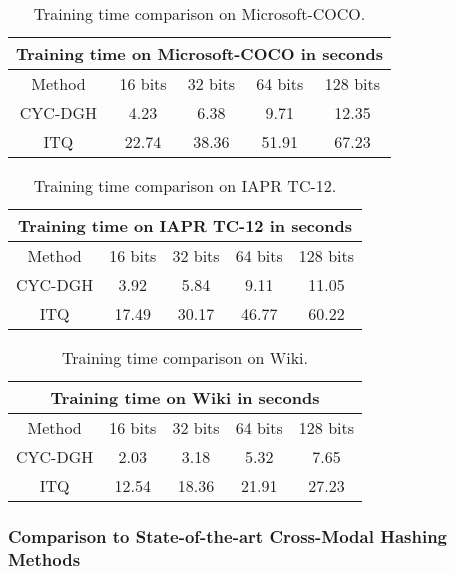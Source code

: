 \documentclass[10pt,journal,twocolumn]{IEEEtran}
\begin{document}
\begin{table}[t]
  \centering
  \begin{tabular}{ |c|c|c|c|c|}
  \hline
  \multicolumn{5}{|c|}{Training time on Microsoft-COCO in seconds} \\
  \hline
  Method & 16 bits & 32 bits & 64 bits & 128 bits\\
  \hline
  CYC-DGH & 4.23 & 6.38 & 9.71 & 12.35 \\
  ITQ \cite{ITQ} & 22.74 & 38.36 & 51.91 & 67.23\\
  \hline
\end{tabular}
  \caption{Training time comparison on Microsoft-COCO.}\label{tab:train-time-COCO}
\end{table}

\begin{table}[t]
  \centering
  \begin{tabular}{ |c|c|c|c|c|}
  \hline
  \multicolumn{5}{|c|}{Training time on IAPR TC-12 in seconds} \\
  \hline
  Method & 16 bits & 32 bits & 64 bits & 128 bits\\
  \hline
  CYC-DGH & 3.92 & 5.84 & 9.11 & 11.05 \\
  ITQ \cite{ITQ} & 17.49 & 30.17 & 46.77 & 60.22\\
  \hline
\end{tabular}
  \caption{Training time comparison on IAPR TC-12.}\label{tab:train-time-IAPR}
\end{table}


\begin{table}[t]
  \centering
  \begin{tabular}{ |c|c|c|c|c|}
  \hline
  \multicolumn{5}{|c|}{Training time on Wiki in seconds} \\
  \hline
  Method & 16 bits & 32 bits & 64 bits & 128 bits\\
  \hline
  CYC-DGH & 2.03 & 3.18 & 5.32 & 7.65 \\
  ITQ \cite{ITQ} & 12.54 & 18.36 & 21.91 & 27.23\\
  \hline
\end{tabular}
  \caption{Training time comparison on Wiki.}\label{tab:train-time-Wiki}
\end{table}




\subsubsection{Comparison to State-of-the-art Cross-Modal Hashing Methods}
\end{document}
